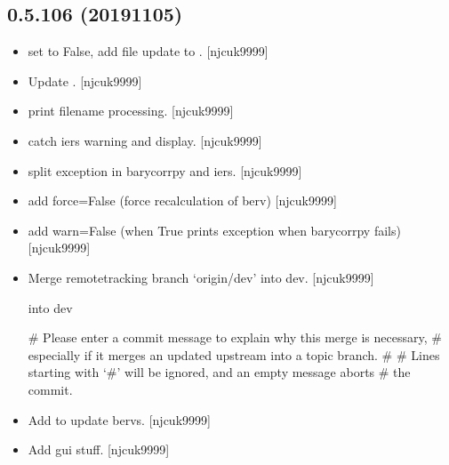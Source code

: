 \documentclass[a4paper,10pt,english]{report}
\begin{document}
\subsection{0.5.106 (2019\sphinxhyphen{}11\sphinxhyphen{}05)}
\label{\detokenize{misc/changelog:id56}}\begin{itemize}
\item {} 
 \sphinxhyphen{} set  to False, add file update to
. {[}njcuk9999{]}

\item {} 
Update . {[}njcuk9999{]}

\item {} 
 \sphinxhyphen{} print filename processing. {[}njcuk9999{]}

\item {} 
 \sphinxhyphen{} catch iers warning and display. {[}njcuk9999{]}

\item {} 
 \sphinxhyphen{} split exception in barycorrpy and iers.
{[}njcuk9999{]}

\item {} 
 \sphinxhyphen{} add force=False (force recalculation of
berv) {[}njcuk9999{]}

\item {} 
 \sphinxhyphen{} add warn=False (when True prints exception
when barycorrpy fails) {[}njcuk9999{]}

\item {} 
Merge remote\sphinxhyphen{}tracking branch ‘origin/dev’ into dev. {[}njcuk9999{]}

 into dev

\# Please enter a commit message to explain why this merge is necessary,
\# especially if it merges an updated upstream into a topic branch.
\#
\# Lines starting with ‘\#’ will be ignored, and an empty message aborts
\# the commit.

\item {} 
Add  \sphinxhyphen{} to update bervs. {[}njcuk9999{]}

\item {} 
Add gui stuff. {[}njcuk9999{]}

\end{itemize}
\end{document}
